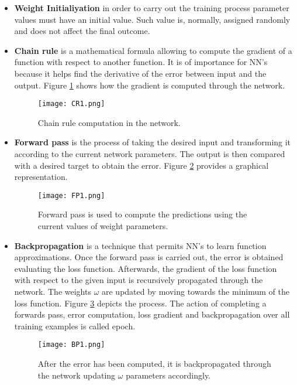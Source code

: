 \begin{itemize}
\item \textbf{Weight Initialiyation} in order to carry out the training process parameter values must have an initial value. Such value is, normally, assigned  randomly and does not affect the final outcome.

\item \textbf{Chain rule} is a mathematical formula allowing to compute the gradient of a function with respect to another function. It is of importance for NN's because it helps find the derivative of the error between input and the output. Figure \ref{fig:CRim1} shows how the  gradient is computed through the network.

\begin{figure}[!tb] 
\centering 
\texttt{[image: CR1.png]} 
\caption[Chain rule in neural networks]{Chain rule computation in the network.}
\label{fig:CRim1} 
\end{figure}

\item \textbf{Forward pass} is the process of taking the desired input and transforming it according to the current network parameters. The output is then compared with a desired target to obtain the error. Figure \ref{fig:FPim1} provides a graphical representation. 

\begin{figure}[!tb] 
\centering 
\texttt{[image: FP1.png]} 
\caption[Forward pass to compute error]{Forward pass is used to compute the predictions using the current values of weight parameters.}
\label{fig:FPim1} 
\end{figure}

\item \textbf{Backpropagation} is a technique that permits NN's to learn function approximations. Once the forward pass is carried out, the error is obtained evaluating the loss function. Afterwards,  the gradient of the loss function with respect to the given input is recursively propagated through the network. The weights $\omega$ are updated by moving towards the minimum of the loss function. Figure \ref{fig:BPim1} depicts the process. The action of completing a forwards pass, error computation, loss gradient and backpropagation over all training examples is called epoch. 

\begin{figure}[!tb] 
\centering 
\texttt{[image: BP1.png]} 
\caption[Backpropagation process through the network]{After the error has been computed, it is backpropagated through the network updating $\omega$ parameters accordingly.}
\label{fig:BPim1} 
\end{figure} 	


\end{itemize}
